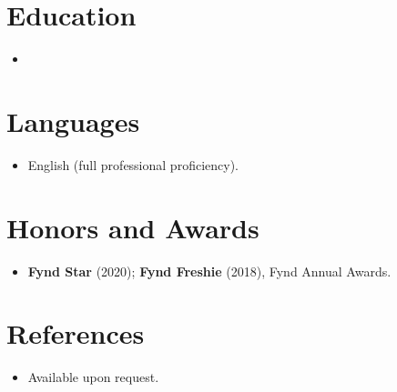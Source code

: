 \documentclass[11pt,a4paper,sans]{moderncv}
\begin{document}

\section{Education}
\vspace{1pt}
\begin{itemize}

\item{}

\end{itemize}


\section{Languages}
\vspace{1pt}
\begin{itemize}
\item {English (full professional proficiency).}
\end{itemize}


\section{Honors and Awards}
\vspace{1pt}
\begin{itemize}
\item{\textbf{Fynd Star} (2020); \textbf{Fynd Freshie} (2018), Fynd Annual Awards.}
\end{itemize}


\section{References}
\vspace{1pt}
\begin{itemize}
\item{Available upon request.}
\end{itemize}
\end{document}

